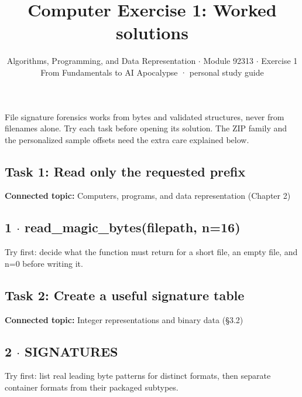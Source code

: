 \documentclass[11pt]{article}
\title{\sffamily\bfseries\color{FAUblue}Computer Exercise 1: Worked solutions}
\author{Algorithms, Programming, and Data Representation \ensuremath{\cdot} Module 92313 \ensuremath{\cdot} Exercise 1\\[2pt]\small From Fundamentals to AI Apocalypse · personal study guide}
\date{}
\begin{document}
\maketitle
\begingroup\footnotesize\setlength{\parskip}{0pt}\tableofcontents\endgroup
\clearpage

{\large File signature forensics works from bytes and validated structures, never from filenames alone. Try each task before opening its solution. The ZIP family and the personalized sample offsets need the extra care explained below.}


\begin{keepsection}
\section{Task 1: Read only the requested prefix}

\textbf{Connected topic:} Computers, programs, and data representation (Chapter 2)

\begin{keepsection}
\subsection{1 \ensuremath{\cdot} read\_magic\_bytes(filepath, n=16)}

Try first: decide what the function must return for a short file, an empty file, and n=0 before writing it.

\end{keepsection}
\end{keepsection}

\begin{keepsection}
\section{Task 2: Create a useful signature table}

\textbf{Connected topic:} Integer representations and binary data (§3.2)

\begin{keepsection}
\subsection{2 \ensuremath{\cdot} SIGNATURES}

Try first: list real leading byte patterns for distinct formats, then separate container formats from their packaged subtypes.

\end{keepsection}
\end{keepsection}
\end{document}
